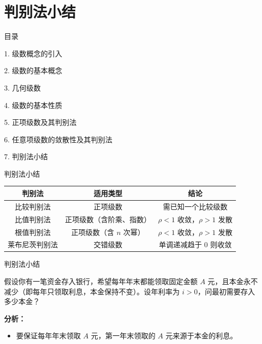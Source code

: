 \documentclass[aspectratio=169,10pt,fontset=fandol]{ctexbeamer}
\begin{document}
\section{判别法小结}
\begin{frame}[t,fragile]{目录}
\normalsize
{\color{black}\normalsize 1. 级数概念的引入\par}\vspace{0.3em}
{\color{black}\normalsize 2. 级数的基本概念\par}\vspace{0.3em}
{\color{black}\normalsize 3. 几何级数\par}\vspace{0.3em}
{\color{black}\normalsize 4. 级数的基本性质\par}\vspace{0.3em}
{\color{black}\normalsize 5. 正项级数及其判别法\par}\vspace{0.3em}
{\color{black}\normalsize 6. 任意项级数的敛散性及其判别法\par}\vspace{0.3em}
{\color{blue}\normalsize 7. 判别法小结\par}\vspace{0.3em}
\end{frame}
\begin{frame}[t,fragile]{判别法小结}
\footnotesize
{\footnotesize
\begin{tabular}{|c|c|c|}
\hline
\textbf{判别法} & \textbf{适用类型} & \textbf{结论} \\
\hline
比较判别法 & 正项级数 & 需已知一个比较级数 \\
\hline
比值判别法 & 正项级数（含阶乘、指数） & \(\rho < 1\) 收敛，\(\rho > 1\) 发散 \\
\hline
根值判别法 & 正项级数（含 \(n\) 次幂） & \(\rho < 1\) 收敛，\(\rho > 1\) 发散 \\
\hline
莱布尼茨判别法 & 交错级数 & 单调递减趋于 0 则收敛 \\
\hline
\end{tabular}
}
\end{frame}
\begin{frame}[t,fragile]{判别法小结}
\footnotesize
{\footnotesize
\begin{application}

假设你有一笔资金存入银行，希望每年年末都能领取固定金额 \(A\) 元，且本金永不减少（即每年只领取利息，本金保持不变）。设年利率为 \(i>0\)，问最初需要存入多少本金？

\textbf{分析：}
\begin{itemize}
\item 要保证每年年末领取 \(A\) 元，第一年末领取的 \(A\) 元来源于本金的利息。

\end{itemize}\end{application}
}
\end{frame}
\end{document}
